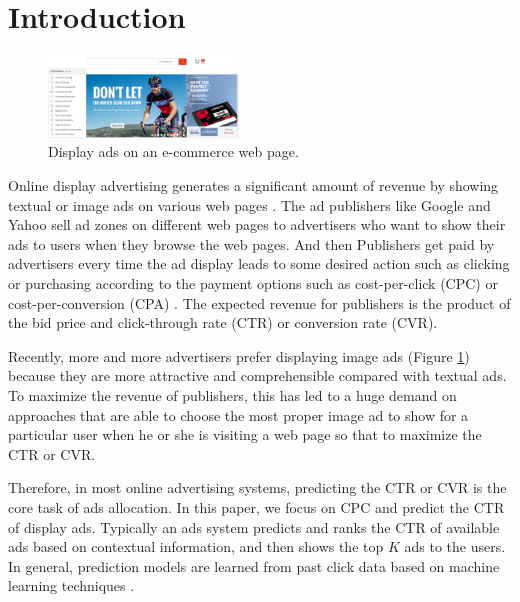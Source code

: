 \documentclass{sig-alternate}
\begin{document}
\section{Introduction}
\begin{figure}
	\centering
	\includegraphics[width=0.45\textwidth]{ad}
	\caption{Display ads on an e-commerce web page.}
	\label{fig:ad}
\end{figure}
Online display advertising generates a significant amount of revenue by showing textual or image ads on various web pages \cite{chapelle2014simple}.   The ad publishers like Google and Yahoo sell  ad zones on different web pages to advertisers who want to show their ads to users when they browse the web pages. And then Publishers get paid by advertisers every time the ad display leads to some desired action  such as clicking or purchasing according to the payment options such as cost-per-click (CPC) or cost-per-conversion (CPA) \cite{mahdian2007pay}. The expected revenue for publishers is the product of the bid price and click-through rate (CTR) or conversion rate (CVR).

Recently, more and more advertisers prefer displaying image ads \cite{mei2011internet} (Figure \ref{fig:ad}) because they are more attractive and comprehensible compared with textual ads.   To maximize the revenue of publishers,  this has led to a huge demand on approaches that are able to choose the most proper image ad to show for a particular user when he or she is visiting a web page so that to maximize the CTR or CVR. 

Therefore, in most online advertising systems, predicting the CTR or CVR is the core task of ads allocation.  In this paper, we focus on CPC and predict the CTR of display ads. Typically an ads system  predicts and ranks the CTR of available ads based on contextual information, and then shows the top $K$ ads to the users. In general, prediction models are learned from past click data based on machine learning techniques \cite{chapelle2014simple,  richardson2007predicting, he2014practical, dave2010learning, zhang2016deep,mcmahan2013ad}.
\end{document}
